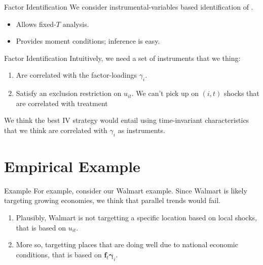\documentclass[aspectratio=43,t]{beamer}
\begin{document}
\begin{frame}{Factor Identification}
We consider instrumental-variables based identification of \citet{Ahn_Lee_Schmidt_2013}.
\begin{itemize}
    \item Allows fixed-$T$ analysis.
    \item Provides moment conditions; inference is easy.
\end{itemize}

\end{frame}

\begin{frame}{Factor Identification}
  Intuitively, we need a set of instruments that we thing:

  \begin{enumerate}
    \item Are correlated with the factor-loadings $\gamma_i$.
    \item Satisfy an exclusion restriction on $u_{it}$. We can't pick up on $(i,t)$ shocks that are correlated with treatment
  \end{enumerate}

  \bigskip
  We think the best IV strategy would entail using time-invariant characteristics that we think are correlated with $\gamma_i$ as instruments. 
\end{frame}

\section{Empirical Example}

\begin{frame}{Example}
  For example, consider our Walmart example. Since Walmart is likely targeting growing economies, we think that parallel trends would fail.

  \begin{enumerate}
    \item Plausibly, Walmart is not targetting a specific location based on local shocks, that is based on $u_{it}$. 
    
    \item More so, targetting places that are doing well due to national economic conditions, that is based on $\bm{f}_t \bm{\gamma}_i$.
  \end{enumerate}
\end{frame}
\end{document}
